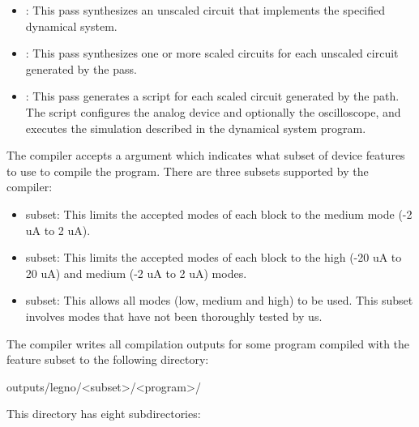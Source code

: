 \begin{itemize}
  \item\lgraph: This pass synthesizes an unscaled circuit that implements the
    specified dynamical system.
  \item\lscale : This pass synthesizes one or more scaled circuits for each
    unscaled circuit generated by the \lgraph pass.
  \item\srcgen: This pass generates a  script for each
    scaled circuit generated by the \lscale path. The  script
    configures the analog device and optionally the oscilloscope, and executes
    the simulation described in the dynamical system program.
  \end{itemize}

The \legno compiler accepts a  argument which indicates what subset of
device features to use to compile the program. There are three subsets supported
by the compiler:

\begin{itemize}
\item{} subset: This limits the accepted modes of each block to the
  medium mode (-2 uA to 2 uA). 
\item{} subset: This limits the accepted modes of each block to the
  high (-20 uA to 20 uA) and medium (-2 uA to 2 uA) modes.
\item{} subset: This allows all modes (low, medium and high) to
  be used. This subset involves modes that have not been thoroughly tested by us.
\end{itemize}

The \legno compiler writes all compilation outputs for some program
 compiled with the feature subset  to the following
directory:

\begin{snippet}
  outputs/legno/<subset>/<program>/
\end{snippet}

This directory has eight subdirectories:

